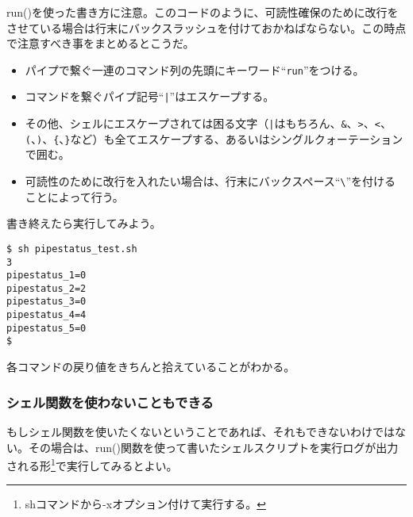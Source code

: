 run()を使った書き方に注意。このコードのように、可読性確保のために改行をさせている場合は行末にバックスラッシュを付けておかねばならない。この時点で注意すべき事をまとめるとこうだ。
\begin{itemize}
  \item パイプで繋ぐ一連のコマンド列の先頭にキーワード``\verb|run|''をつける。
  \item コマンドを繋ぐパイプ記号``\verb!|!''はエスケープする。
  \item その他、シェルにエスケープされては困る文字（\verb!|!はもちろん、\verb!&!、\verb!>!、\verb!<!、\verb!(!、\verb!)!、\verb!{!、\verb!}!など）も全てエスケープする、あるいはシングルクォーテーションで囲む。
  \item 可読性のために改行を入れたい場合は、行末にバックスペース``\verb|\|''を付けることによって行う。
\end{itemize}

書き終えたら実行してみよう。

\begin{screen}
	\verb|$ sh pipestatus_test.sh| \return \\
	\verb|3| \\
	\verb|pipestatus_1=0| \\
	\verb|pipestatus_2=2| \\
	\verb|pipestatus_3=0| \\
	\verb|pipestatus_4=4| \\
	\verb|pipestatus_5=0| \\
	\verb|$ |
\end{screen}

各コマンドの戻り値をきちんと拾えていることがわかる。

\subsubsection*{シェル関数を使わないこともできる}

もしシェル関数を使いたくないということであれば、それもできないわけではない。その場合は、run()関数を使って書いたシェルスクリプトを実行ログが出力される形\footnote{shコマンドから-xオプション付けて実行する。}で実行してみるとよい。

